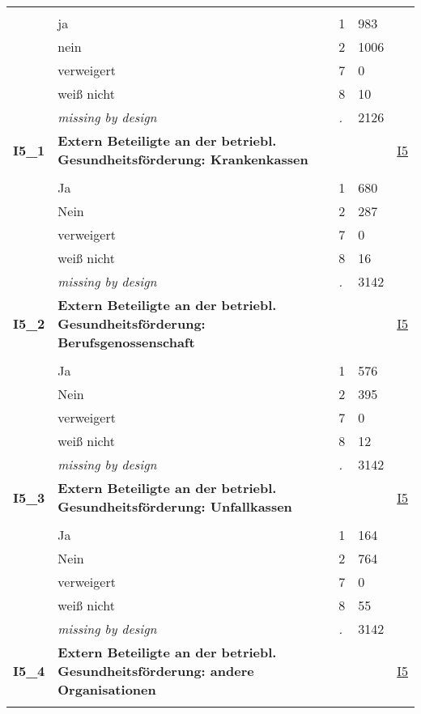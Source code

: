 \begin{longtable}{| L{2.65cm} | L{8cm} | C{1.5cm} | R{1.25cm} | C{2.25cm}  |}
   &  &  &  &  \\ 
   & ja & 1 & 983 &  \\ 
   & nein & 2 & 1006 &  \\ 
   & verweigert & 7 & 0 &  \\ 
   & weiß nicht & 8 & 10 &  \\ 
   & \textit{missing by design} & \textit{.} & 2126 &  \\ 
   \midrule
\textbf{I5\_1}\label{var:I5:1} & \textbf{Extern Beteiligte an der betriebl. Gesundheitsförderung: Krankenkassen} &  &  & \hyperref[I5]{I5} \\ 
   &  &  &  &  \\ 
   & Ja & 1 & 680 &  \\ 
   & Nein & 2 & 287 &  \\ 
   & verweigert & 7 & 0 &  \\ 
   & weiß nicht & 8 & 16 &  \\ 
   & \textit{missing by design} & \textit{.} & 3142 &  \\ 
   \midrule
\textbf{I5\_2}\label{var:I5:2} & \textbf{Extern Beteiligte an der betriebl. Gesundheitsförderung: Berufsgenossenschaft} &  &  & \hyperref[I5]{I5} \\ 
   &  &  &  &  \\ 
   & Ja & 1 & 576 &  \\ 
   & Nein & 2 & 395 &  \\ 
   & verweigert & 7 & 0 &  \\ 
   & weiß nicht & 8 & 12 &  \\ 
   & \textit{missing by design} & \textit{.} & 3142 &  \\ 
   \midrule
\textbf{I5\_3}\label{var:I5:3} & \textbf{Extern Beteiligte an der betriebl. Gesundheitsförderung: Unfallkassen} &  &  & \hyperref[I5]{I5} \\ 
   &  &  &  &  \\ 
   & Ja & 1 & 164 &  \\ 
   & Nein & 2 & 764 &  \\ 
   & verweigert & 7 & 0 &  \\ 
   & weiß nicht & 8 & 55 &  \\ 
   & \textit{missing by design} & \textit{.} & 3142 &  \\ 
   \midrule
\textbf{I5\_4}\label{var:I5:4} & \textbf{Extern Beteiligte an der betriebl. Gesundheitsförderung: andere Organisationen} &  &  & \hyperref[I5]{I5} \\ 
   &  &  &  &  \\ 

\end{longtable}
